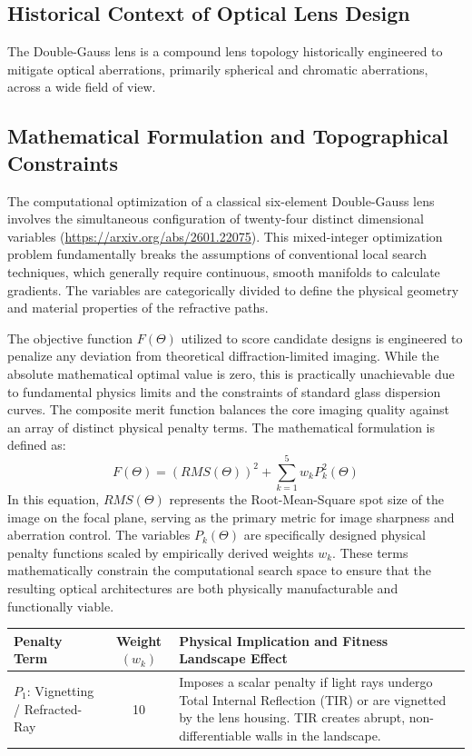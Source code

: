 \documentclass[12pt]{article}
\begin{document}
\subsection{Historical Context of Optical Lens Design}

The Double-Gauss lens is a compound lens topology historically engineered to mitigate optical aberrations, primarily spherical and chromatic aberrations, across a wide field of view. 

\subsection{Mathematical Formulation and Topographical Constraints}
The computational optimization of a classical six-element Double-Gauss lens involves the simultaneous configuration of twenty-four distinct dimensional variables (\url{https://arxiv.org/abs/2601.22075}). This mixed-integer optimization problem fundamentally breaks the assumptions of conventional local search techniques, which generally require continuous, smooth manifolds to calculate gradients. The variables are categorically divided to define the physical geometry and material properties of the refractive paths.

The objective function $F(\Theta)$ utilized to score candidate designs is engineered to penalize any deviation from theoretical diffraction-limited imaging. While the absolute mathematical optimal value is zero, this is practically unachievable due to fundamental physics limits and the constraints of standard glass dispersion curves. The composite merit function balances the core imaging quality against an array of distinct physical penalty terms. The mathematical formulation is defined as:
\[
F(\Theta) = (RMS(\Theta))^2 + \sum^{5}_{k=1} w_k P^2_k(\Theta) 
\]
In this equation, $RMS(\Theta)$ represents the Root-Mean-Square spot size of the image on the focal plane, serving as the primary metric for image sharpness and aberration control. The variables $P_k(\Theta)$ are specifically designed physical penalty functions scaled by empirically derived weights $w_k$. These terms mathematically constrain the computational search space to ensure that the resulting optical architectures are both physically manufacturable and functionally viable.

\begin{table}[h]
\centering
\begin{tabular}{p{4cm} c p{8cm}}
\hline
\textbf{Penalty Term} & \textbf{Weight $(w_k)$} & \textbf{Physical Implication and Fitness Landscape Effect} \\
\hline
$P_1$: Vignetting / Refracted-Ray & 10 & Imposes a scalar penalty if light rays undergo Total Internal Reflection (TIR) or are vignetted by the lens housing. TIR creates abrupt, non-differentiable walls in the landscape. \\
\hline
\end{tabular}
\end{table}
\end{document}
